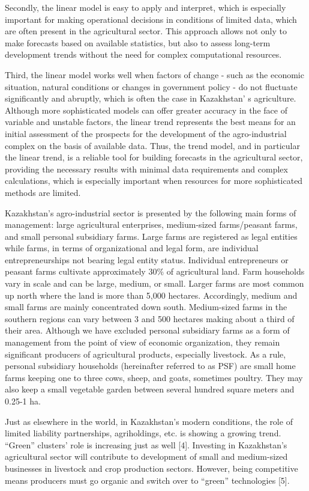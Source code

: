 \begin{multicols}{2}
Secondly, the linear model is easy to apply and interpret, which is
especially important for making operational decisions in conditions of
limited data, which are often present in the agricultural sector. This
approach allows not only to make forecasts based on available
statistics, but also to assess long-term development trends without the
need for complex computational resources.

Third, the linear model works well when factors of change - such as the
economic situation, natural conditions or changes in government policy -
do not fluctuate significantly and abruptly, which is often the case in
Kazakhstan' s agriculture. Although more sophisticated
models can offer greater accuracy in the face of variable and unstable
factors, the linear trend represents the best means for an initial
assessment of the prospects for the development of the agro-industrial
complex on the basis of available data. Thus, the trend model, and in
particular the linear trend, is a reliable tool for building forecasts
in the agricultural sector, providing the necessary results with minimal
data requirements and complex calculations, which is especially
important when resources for more sophisticated methods are limited.

Kazakhstan's agro-industrial sector is presented by the following main
forms of management: large agricultural enterprises, medium-sized
farms/peasant farms, and small personal subsidiary farms. Large farms
are registered as legal entities while farms, in terms of organizational
and legal form, are individual entrepreneurships not bearing legal
entity status. Individual entrepreneurs or peasant farms cultivate
approximately 30\% of agricultural land. Farm households vary in scale
and can be large, medium, or small. Larger farms are most common up
north where the land is more than 5,000 hectares. Accordingly, medium
and small farms are mainly concentrated down south. Medium-sized farms
in the southern regions can vary between 3 and 500 hectares making about
a third of their area. Although we have excluded personal subsidiary
farms as a form of management from the point of view of economic
organization, they remain significant producers of agricultural
products, especially livestock. As a rule, personal subsidiary
households (hereinafter referred to as PSF) are small home farms keeping
one to three cows, sheep, and goats, sometimes poultry. They may also
keep a small vegetable garden between several hundred square meters and
0.25-1 ha.

Just as elsewhere in the world, in Kazakhstan's modern conditions, the
role of limited liability partnerships, agriholdings, etc. is showing a
growing trend. ``Green'' clusters' role is increasing just as well
{[}4{]}. Investing in Kazakhstan's agricultural sector will contribute
to development of small and medium-sized businesses in livestock and
crop production sectors. However, being competitive means producers must
go organic and switch over to ``green'' technologies {[}5{]}.


\end{multicols}
